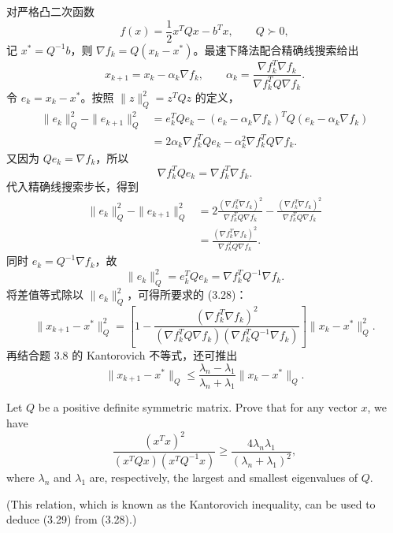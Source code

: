 \documentclass{ctexart}
\begin{document}
\begin{solution}
对严格凸二次函数
\[
    f(x)=\frac12x^TQx-b^Tx,
    \qquad Q\succ0,
\]
记 $x^*=Q^{-1}b$，则 $\nabla f_k=Q(x_k-x^*)$。最速下降法配合精确线搜索给出
\[
    x_{k+1}=x_k-\alpha_k\nabla f_k,
    \qquad
    \alpha_k=\frac{\nabla f_k^T\nabla f_k}
                    {\nabla f_k^TQ\nabla f_k}.
\]
令 $e_k=x_k-x^*$。按照 $\|z\|_Q^2=z^TQz$ 的定义，
\begin{align*}
\|e_k\|_Q^2-\|e_{k+1}\|_Q^2
&=e_k^TQe_k-(e_k-\alpha_k\nabla f_k)^T
Q(e_k-\alpha_k\nabla f_k)\\
&=2\alpha_k\nabla f_k^TQe_k
  -\alpha_k^2\nabla f_k^TQ\nabla f_k.
\end{align*}
又因为 $Qe_k=\nabla f_k$，所以
\[
    \nabla f_k^TQe_k=\nabla f_k^T\nabla f_k.
\]
代入精确线搜索步长，得到
\begin{align*}
\|e_k\|_Q^2-\|e_{k+1}\|_Q^2
&=2\frac{(\nabla f_k^T\nabla f_k)^2}
        {\nabla f_k^TQ\nabla f_k}
 -\frac{(\nabla f_k^T\nabla f_k)^2}
        {\nabla f_k^TQ\nabla f_k}\\
&=\frac{(\nabla f_k^T\nabla f_k)^2}
        {\nabla f_k^TQ\nabla f_k}.
\end{align*}
同时 $e_k=Q^{-1}\nabla f_k$，故
\[
    \|e_k\|_Q^2=e_k^TQe_k
    =\nabla f_k^TQ^{-1}\nabla f_k.
\]
将差值等式除以 $\|e_k\|_Q^2$，可得所要求的 (3.28)：
\[
    \boxed{
    \|x_{k+1}-x^*\|_Q^2
    =\left[1-
    \frac{(\nabla f_k^T\nabla f_k)^2}
    {(\nabla f_k^TQ\nabla f_k)
     (\nabla f_k^TQ^{-1}\nabla f_k)}\right]
    \|x_k-x^*\|_Q^2.}
\]
再结合题 3.8 的 Kantorovich 不等式，还可推出
\[
    \|x_{k+1}-x^*\|_Q
    \leq\frac{\lambda_n-\lambda_1}{\lambda_n+\lambda_1}
    \|x_k-x^*\|_Q.
\]
\end{solution}

\begin{problem}[3.8]
Let $Q$ be a positive definite symmetric matrix. Prove that for any vector $x$,
we have
\[
    \frac{(x^Tx)^2}
         {(x^TQx)(x^TQ^{-1}x)}
    \geq
    \frac{4\lambda_n\lambda_1}
         {(\lambda_n+\lambda_1)^2},
\]
where $\lambda_n$ and $\lambda_1$ are, respectively, the largest and smallest
eigenvalues of $Q$.

(This relation, which is known as the Kantorovich inequality, can be used to
deduce (3.29) from (3.28).)
\end{problem}
\end{document}
